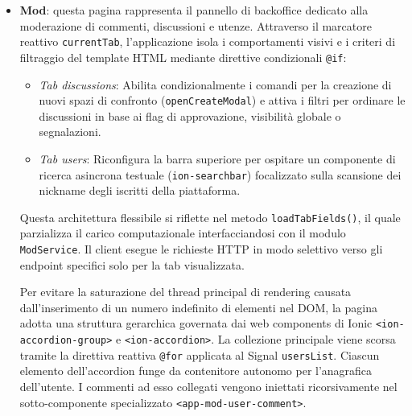 \documentclass[11pt,a4paper]{article}
\begin{document}
\begin{itemize}
    Poiché il framework distribuisce l'applicazione in sotto-percorsi URL isolati per ciascuna lingua (\texttt{/it/} o \texttt{/en/}), il metodo di login non si limita a invocare il metodo di navigazione standard del router, ma analizza preventivamente il contesto geografico tramite il servizio \texttt{LanguageService}. Se l'applicazione rileva che la lingua attiva memorizzata nel client (\texttt{appLang}) non coincide con il prefisso attualmente presente nell'indirizzo URL del browser, il componente forza una riassegnazione hardware del viewport tramite l'istruzione ``\texttt{window.location.href = window.location.origin + `/` + appLang + targetRoute}''. Questa ricarica mirata garantisce che l'utente venga rediretto sulla dashboard corretta (\texttt{/tabs/home}). Le eccezioni o i fallimenti di autenticazione vengono catturati dal blocco \texttt{error}, il quale inibisce l'accesso e notifica l'errore sintattico mediante stringhe tradotte dinamicamente a runtime tramite il tag \texttt{\$localize} integrato nel \texttt{ToastController};
    \item \textbf{Mod}: questa pagina rappresenta il pannello di backoffice dedicato alla moderazione di commenti, discussioni e utenze. Attraverso il marcatore reattivo \texttt{currentTab}, l'applicazione isola i comportamenti visivi e i criteri di filtraggio del template HTML mediante direttive condizionali \texttt{@if}:
    \begin{itemize}
        \item \textit{Tab discussions}: Abilita condizionalmente i comandi per la creazione di nuovi spazi di confronto (\texttt{openCreateModal}) e attiva i filtri per ordinare le discussioni in base ai flag di approvazione, visibilità globale o segnalazioni.
        \item \textit{Tab users}: Riconfigura la barra superiore per ospitare un componente di ricerca asincrona testuale (\texttt{ion-searchbar}) focalizzato sulla scansione dei nickname degli iscritti della piattaforma.
    \end{itemize}
    Questa architettura flessibile si riflette nel metodo \texttt{loadTabFields()}, il quale parzializza il carico computazionale interfacciandosi con il modulo \texttt{ModService}. Il client esegue le richieste HTTP in modo selettivo verso gli endpoint specifici solo per la tab visualizzata.
    
    Per evitare la saturazione del thread principal di rendering causata dall'inserimento di un numero indefinito di elementi nel DOM, la pagina adotta una struttura gerarchica governata dai web components di Ionic \texttt{<ion-accordion-group>} e \texttt{<ion-accordion>}. La collezione principale viene scorsa tramite la direttiva reattiva \texttt{@for} applicata al Signal \texttt{usersList}. Ciascun elemento dell'accordion funge da contenitore autonomo per l'anagrafica dell'utente. I commenti ad esso collegati vengono iniettati ricorsivamente nel sotto-componente specializzato \texttt{<app-mod-user-comment>}.
    

\end{itemize}
\end{document}
